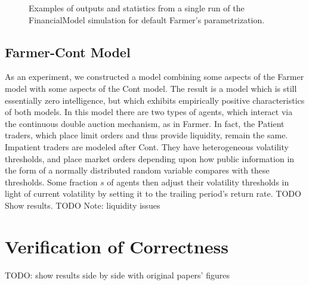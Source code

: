 \documentclass[runningheads]{llncs}
\begin{document}
\begin{figure}[htbp]
\begin{center}
{      }
    \caption{Examples of outputs and statistics from a single run of the FinancialModel simulation for default Farmer's parametrization.}
    \label{fig:sampleDynamicsFarmer}
  \end{center}
\end{figure}

\subsection{Farmer-Cont Model}
As an experiment, we constructed a model combining some aspects of the Farmer model with some aspects of the Cont model. The result is a model which is still essentially zero intelligence, but which exhibits empirically positive characteristics of both models. In this model there are two types of agents, which interact via the continuous double auction mechanism, as in Farmer. In fact, the Patient traders, which place limit orders and thus provide liquidity, remain the same. Impatient traders are modeled after Cont. They have heterogeneous volatility thresholds, and place market orders depending upon how public information in the form of a normally distributed random variable compares with these thresholds. Some fraction $s$ of agents then adjust their volatility thresholds in light of current volatility by setting it to the trailing period's return rate.
TODO Show results.
TODO Note: liquidity issues



\section{Verification of Correctness}
TODO: show results side by side with original papers' figures


\end{document}
